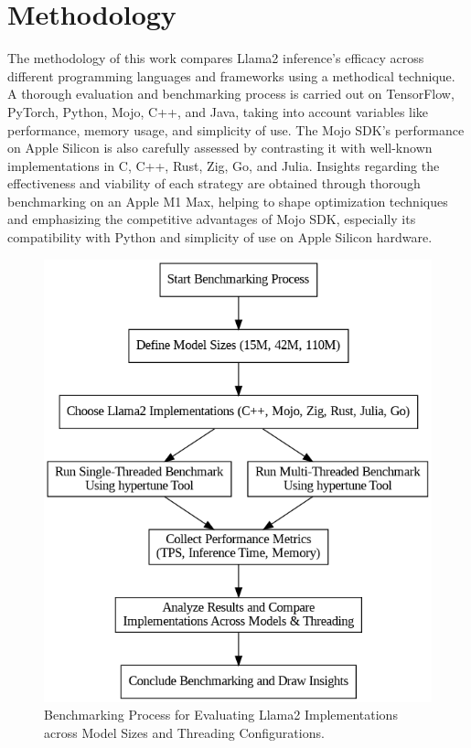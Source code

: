 \documentclass[sigconf]{acmart}
\begin{document}
\section{Methodology}
The methodology of this work compares Llama2 inference's efficacy across different programming languages and frameworks using a methodical technique. A thorough evaluation and benchmarking process is carried out on TensorFlow, PyTorch, Python, Mojo, C++, and Java, taking into account variables like performance, memory usage, and simplicity of use. The Mojo SDK's performance on Apple Silicon is also carefully assessed by contrasting it with well-known implementations in C, C++, Rust, Zig, Go, and Julia. Insights regarding the effectiveness and viability of each strategy are obtained through thorough benchmarking on an Apple M1 Max, helping to shape optimization techniques and emphasizing the competitive advantages of Mojo SDK, especially its compatibility with Python and simplicity of use on Apple Silicon hardware.
\begin{figure}[htbp]
  \centering
  \includegraphics[width=\linewidth]{benchmark_flowchart_detailed}
  \caption{Benchmarking Process for Evaluating Llama2 Implementations across Model Sizes and Threading Configurations.}
\end{figure}
\end{document}
